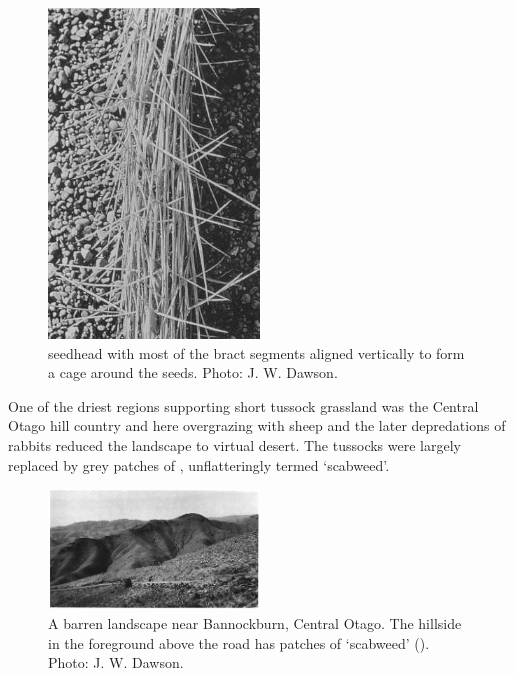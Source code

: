 \begin{figure}
	\includegraphics[width=0.5\textwidth]{graphics/figure85aciphylla-seedhead.jpg}
	\centering
	\caption[Aciphylla subflabellata seedhead]{ seedhead with most of the bract segments aligned vertically to form a cage around the seeds.
	Photo:  J. W. Dawson.}%
	\label{fig:85aciphylla-seedhead}
\end{figure}

One of the driest regions supporting short tussock grassland was the Central Otago hill country and here overgrazing with sheep and the later depredations of rabbits reduced the landscape to virtual desert.
The tussocks were largely replaced by grey patches of , unflatteringly termed `scabweed'.

\begin{figure}
	\includegraphics[width=0.5\textwidth]{graphics/figure86barren.jpg}
	\centering
	\caption[A barren landscape near Bannockburn]{A barren landscape near Bannockburn, Central Otago.
	The hillside in the foreground above the road has patches of `scabweed' ().
	Photo:  J. W. Dawson.}%
	\label{fig:86barren}
\end{figure}

